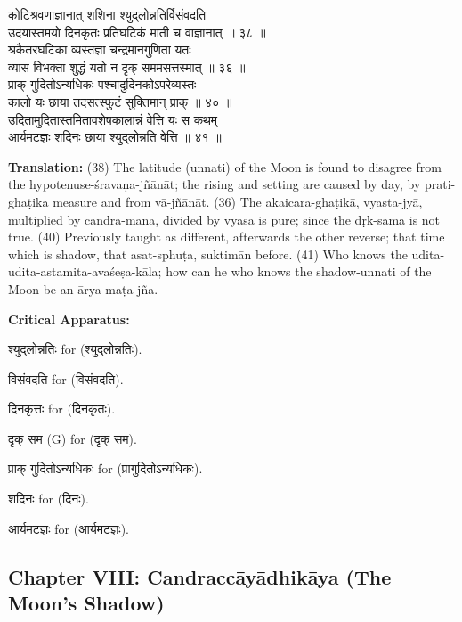 \documentclass[11pt,a4paper]{article}
\newcommand{\dev}[1]{{\devanagarifont #1}}
\newcommand{\sanskritcol}[1]{%
  \begin{minipage}[t]{0.47\textwidth}
  \vspace{0pt}
  \begin{flushleft}
  #1
  \end{flushleft}
  \end{minipage}%
  \hfill
}
\newcommand{\englishcol}[1]{%
  \begin{minipage}[t]{0.47\textwidth}
  \vspace{0pt}
  \begin{flushleft}
  #1
  \end{flushleft}
  \end{minipage}%
}
\newenvironment{variants}{%
  \small%
  \color{varecolor}%
  \list{}{\leftmargin=2em\itemindent=-1em}%
}{\endlist}
\begin{document}
\noindent
\sanskritcol{\dev{कोटिश्रवणाज्ञानात् शशिना श्युद्लोन्नतिर्विसंवदति} \\ \dev{उदयास्तमयो दिनकृतः प्रतिघटिकं माती च वाज्ञानात् ॥ ३८ ॥} \\[0.2cm]
\dev{श्रकैतरघटिका व्यस्तज्ञा चन्द्रमानगुणिता यतः} \\ \dev{व्यास विभक्ता शुद्धं यतो न दृक् सममसत्तस्मात् ॥ ३६ ॥} \\[0.2cm]
\dev{प्राक् गुदितोऽन्यधिकः पश्चादुदिनकोऽपरेव्यस्तः} \\ \dev{कालो यः छाया तदसत्स्फुटं सुक्तिमान् प्राक् ॥ ४० ॥} \\[0.2cm]
\dev{उदितामुदितास्तमितावशेषकालान्नं वेत्ति यः स कथम्} \\ \dev{आर्यमटज्ञः शदिनः छाया श्युद्लोन्नति वेत्ति ॥ ४१ ॥}}
\englishcol{\textbf{Translation:} (38) The latitude (unnati) of the Moon is found to disagree
from the hypotenuse-śravaṇa-jñānāt; the rising and setting are caused by day,
by prati-ghaṭika measure and from vā-jñānāt. (36) The akaicara-ghaṭikā, vyasta-jyā,
multiplied by candra-māna, divided by vyāsa is pure; since the dṛk-sama is not
true. (40) Previously taught as different, afterwards the other reverse; that
time which is shadow, that asat-sphuṭa, suktimān before. (41) Who knows the
udita-udita-astamita-avaśeṣa-kāla; how can he who knows the shadow-unnati of
the Moon be an ārya-maṭa-jña.}

\vspace{0.4cm}
\textcolor{varecolor}{\textbf{Critical Apparatus:}}
\begin{variants}
\item[38.1] \dev{श्युद्लोन्नतिः} \dev{for} (\dev{श्युद्लोन्नतिः}).
\item[38.2] \dev{विसंवदति} \dev{for} (\dev{विसंवदति}).
\item[38.3] \dev{दिनकृत्तः} \dev{for} (\dev{दिनकृतः}).
\item[36.1] \dev{दृक् सम} (G) \dev{for} (\dev{दृक् सम}).
\item[40.1] \dev{प्राक् गुदितोऽन्यधिकः} \dev{for} (\dev{प्रागुदितोऽन्यधिकः}).
\item[41.1] \dev{शदिनः} \dev{for} (\dev{दिनः}).
\item[41.2] \dev{आर्यमटज्ञः} \dev{for} (\dev{आर्यमटज्ञः}).
\end{variants}

\subsection*{Chapter VIII: Candraccāyādhikāya (The Moon's Shadow)}
\end{document}
